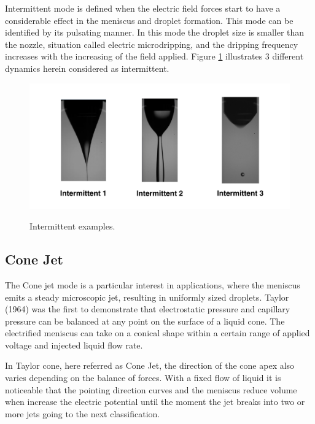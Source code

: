 Intermittent mode is defined when the electric field forces start to have a considerable effect in the meniscus and droplet formation. 
This mode can be identified by its pulsating manner.
In this mode the droplet size is smaller than the nozzle, situation called electric microdripping, and the dripping frequency increases with the increasing of the field applied.
Figure \ref{fig:intermittent_example} illustrates 3 different dynamics herein considered as intermittent.


  \begin{figure}[H]
      \center
      \includegraphics[width=15cm]{Figuras/19:03/intermittent_example.png}
      \label{fig:intermittent_example}
      \caption{Intermittent examples.}
  \end{figure}


\subsection{Cone Jet}
\label{subsec:Cone Jet}

The Cone jet mode is a particular interest in applications, where the meniscus emits a steady microscopic jet, resulting in uniformly sized droplets. 
Taylor (1964)\cite{taylor} was the first to demonstrate that electrostatic pressure and capillary pressure can be balanced at any point on the surface of a liquid cone.
The electrified meniscus can take on a conical shape within a certain range of applied voltage and injected liquid flow rate. 

In Taylor cone, here referred as Cone Jet, the direction of the cone apex also varies depending on the balance of forces. 
With a fixed flow of liquid it is noticeable that the pointing direction curves and the meniscus reduce volume when increase the electric potential until the moment the jet breaks into two or more jets going to the next classification. 

